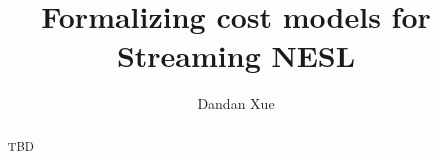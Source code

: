 \documentclass[a4paper]{article}
\title{Formalizing cost models for Streaming NESL}
\author{Dandan Xue}
\numberwithin{equation}{section}
\numberwithin{figure}{section}
\begin{document}
\large
\maketitle

\begin{abstract}
	TBD
\end{abstract}


\tableofcontents
\newpage








\newpage


\end{document}
